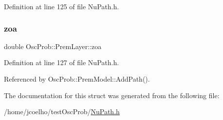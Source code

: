 Definition at line 125 of file Nu\+Path.\+h.

\mbox{\label{structOscProb_1_1PremLayer_a8687a8169d786fca79908292d11077f5}} 
\subsubsection{\texorpdfstring{zoa}{zoa}}
{\footnotesize\ttfamily double Osc\+Prob\+::\+Prem\+Layer\+::zoa}



Definition at line 127 of file Nu\+Path.\+h.



Referenced by Osc\+Prob\+::\+Prem\+Model\+::\+Add\+Path().



The documentation for this struct was generated from the following file\+:\begin{DoxyCompactItemize}
\item 
/home/jcoelho/test\+Osc\+Prob/\hyperlink{NuPath_8h}{Nu\+Path.\+h}\end{DoxyCompactItemize}
